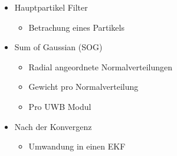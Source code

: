 \documentclass{beamer}
\begin{document}
\begin{frame}
\begin{columns}
\begin{overlayarea}{\textwidth}{.5\textheight}
{				}
			\end{overlayarea}
			\begin{itemize}
				\item Hauptpartikel Filter
				\begin{itemize}
					\item Betrachung eines Partikels
				\end{itemize}
				\item Sum of Gaussian (SOG)
				\begin{itemize}
					\item Radial angeordnete Normalverteilungen
					\item Gewicht pro Normalverteilung
					\item Pro UWB Modul
				\end{itemize}
				\item<4-> Nach der Konvergenz
				\begin{itemize}
					\item Umwandung in einen EKF
				\end{itemize}
			\end{itemize}
	\end{columns}
\end{frame}
\end{document}
